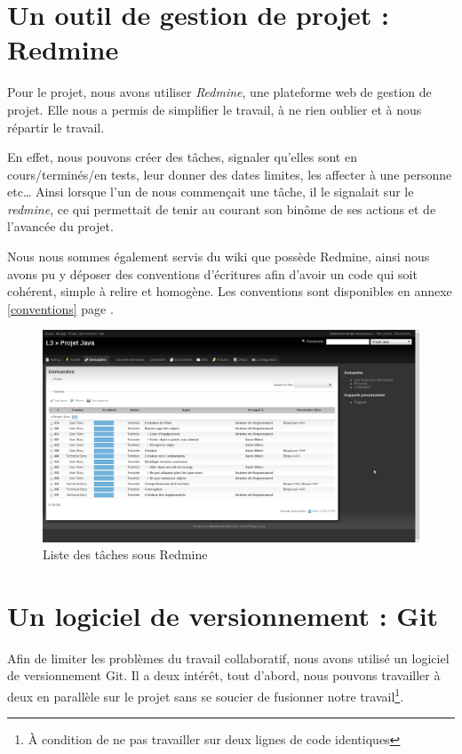 \documentclass[12pt,a4paper,openany]{book}
\begin{document}
	\section{Un outil de gestion de projet : Redmine}
	Pour le projet, nous avons utiliser \textit{Redmine}, une plateforme web de gestion de projet. Elle nous a permis de simplifier le travail,
	à ne rien oublier et à nous répartir le travail.

	En effet, nous pouvons créer des tâches, signaler qu'elles sont en cours/terminés/en tests, leur donner des dates limites, les affecter à une personne etc\ldots
	Ainsi lorsque l'un de nous commençait une tâche, il le signalait sur le \textit{redmine}, ce qui permettait de tenir au courant son binôme de ses actions et
	de l'avancée du projet.

	Nous nous sommes également servis du wiki que possède Redmine, ainsi nous avons pu y déposer des conventions d'écritures afin d'avoir un code qui soit
	cohérent, simple à relire et homogène. Les conventions sont disponibles en annexe \ref{conventions} page \pageref{conventions}.
	\begin{figure}[H]
		\centering
		\includegraphics[width=18cm]{screens/redmine.png}
		\caption{Liste des tâches sous Redmine}
	\end{figure}

	\section{Un logiciel de versionnement : Git}
	Afin de limiter les problèmes du travail collaboratif, nous avons utilisé un logiciel de versionnement Git. Il a deux intérêt, tout d'abord, nous pouvons
	travailler à deux en parallèle sur le projet sans se soucier de fusionner notre travail\footnote{À condition de ne pas travailler sur deux lignes de code
	identiques}.
\end{document}
